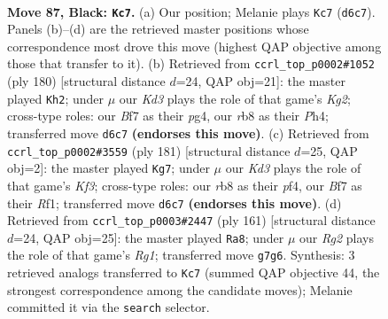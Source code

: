 \documentclass[11pt]{article}
\begin{document}
\clearpage

\begin{figure}[p]\centering
\begin{subfigure}{0.46\textwidth}\centering
\resizebox{\linewidth}{!}{%
\newchessgame
\chessboard[
  setfen={1R6/5br1/3k4/1P2R3/4K3/8/8/8 b - - 2 87},
  showmover=false,
  pgfstyle=straightmove, color=movearrow, markmove={d6-c7}
]}
\caption{}
\end{subfigure}\hfill
\begin{subfigure}{0.46\textwidth}\centering
\resizebox{\linewidth}{!}{%
\newchessgame
\chessboard[
  setfen={2R5/8/8/5k2/6pP/5r2/6K1/8 w - - 13 91},
  showmover=false,
  pgfstyle=straightmove, color=movearrow, markmove={g2-h2}
]}
\caption{}
\end{subfigure}
\\[4pt]
\begin{subfigure}{0.46\textwidth}\centering
\resizebox{\linewidth}{!}{%
\newchessgame
\chessboard[
  setfen={8/8/5k2/7P/5P2/6KR/8/5r2 b - - 6 91},
  showmover=false,
  pgfstyle=straightmove, color=movearrow, markmove={f6-g7}
]}
\caption{}
\end{subfigure}\hfill
\begin{subfigure}{0.46\textwidth}\centering
\resizebox{\linewidth}{!}{%
\newchessgame
\chessboard[
  setfen={6r1/8/8/8/4b1k1/7R/5P1K/8 b - - 29 81},
  showmover=false,
  pgfstyle=straightmove, color=movearrow, markmove={g8-a8}
]}
\caption{}
\end{subfigure}
\caption{\textbf{Move 87, Black: \texttt{Kc7}.} (a) Our position; Melanie plays \texttt{Kc7} (\texttt{d6c7}). Panels (b)--(d) are the retrieved master positions whose correspondence most drove this move (highest QAP objective among those that transfer to it). (b) Retrieved from \texttt{ccrl\_top\_p0002\#1052} (ply 180) [structural distance $d$=24, QAP obj=21]: the master played \texttt{Kh2}; under $\mu$ our \emph{Kd3} plays the role of that game's \emph{Kg2}; cross-type roles: our \emph{B}f7 as their \emph{p}g4, our \emph{r}b8 as their \emph{P}h4; transferred move \texttt{d6c7} \textbf{(endorses this move)}. (c) Retrieved from \texttt{ccrl\_top\_p0002\#3559} (ply 181) [structural distance $d$=25, QAP obj=2]: the master played \texttt{Kg7}; under $\mu$ our \emph{Kd3} plays the role of that game's \emph{Kf3}; cross-type roles: our \emph{r}b8 as their \emph{p}f4, our \emph{B}f7 as their \emph{R}f1; transferred move \texttt{d6c7} \textbf{(endorses this move)}. (d) Retrieved from \texttt{ccrl\_top\_p0003\#2447} (ply 161) [structural distance $d$=24, QAP obj=25]: the master played \texttt{Ra8}; under $\mu$ our \emph{Rg2} plays the role of that game's \emph{Rg1}; transferred move \texttt{g7g6}. Synthesis: 3 retrieved analogs transferred to \texttt{Kc7} (summed QAP objective 44, the strongest correspondence among the candidate moves); Melanie committed it via the \texttt{search} selector.}
\label{fig:thought-m173}
\end{figure}
\end{document}
